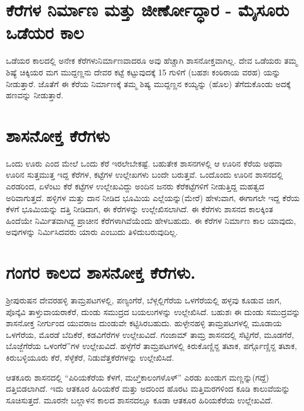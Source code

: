 \section*{ಕೆರೆಗಳ ನಿರ್ಮಾಣ ಮತ್ತು ಜೀರ್ಣೋದ್ಧಾರ - ಮೈಸೂರು ಒಡೆಯರ ಕಾಲ}

ಒಡೆಯರ ಕಾಲದಲ್ಲಿ ಅನೇಕ ಕೆರೆಗಳುನಿರ್ಮಾಣವಾದರೂ ಅವು ಹೆಚ್ಚಾಗಿ ಶಾಸನೋಕ್ತವಾಗಿಲ್ಲ. ದೇವ ಒಡೆಯರು ತಮ್ಮ ಶಿಷ್ಯೆ ಚಿಕ್ಕಿಯರ ಮಗ ಮುದ್ದಣ್ಣನು ದೇವರ ಕಟ್ಟೆ ಕಟ್ಟುವುದಕ್ಕೆ 15 ಗುಳಿಗೆ (ಬಹಶಃ ಕಂಠಿರಾಯ ವರಹ) ಯನ್ನು ನೀಡುತ್ತಾರೆ. ಜೊತೆಗೆ ಈ ಕೆರೆಯ ನಿರ್ಮಾಣಕ್ಕೆ ತಮ್ಮ ಶಿಷ್ಯ ಮುದ್ದಣ್ಣನ ಕಯ್ಯನ್ನು (ಹೊಲ) ತೆಗೆದುಕೊಂಡು ಅದಕ್ಕೆ ಹಣವನ್ನು ನೀಡುತ್ತಾರೆ.

\section*{ಶಾಸನೋಕ್ತ ಕೆರೆಗಳು}

ಒಂದು ಊರು ಎಂದ ಮೇಲೆ ಒಂದು ಕೆರೆ ಇರಲೇಬೇಕಷ್ಟೆ. ಬಹುತೇಕ ಶಾಸನಗಳಲ್ಲಿ ಆ ಊರಿನ ಕೆರೆಯ ಅಥವಾ ಊರಿನ ಸುತ್ತಮುತ್ತ ಇದ್ದ ಕೆರೆಗಳ, ಕಟ್ಟೆಗಳ ಉಲ್ಲೇಖಗಳು ಬಂದೇ ಬರುತ್ತವೆ. ಒಂದೊಂದು ಊರಿನ ಶಾಸನದಲ್ಲಿ ಎರಡರಿಂದ, ಏಳೆಂಟು ಕೆರೆ ಕಟ್ಟೆಗಳ ಉಲ್ಲೇಖವಿದ್ದು ಅಂದಿನ ಜನರು ಕೆರೆಕಟ್ಟೆಗಳಿಗೆ ನೀಡುತ್ತಿದ್ದ ಮಹತ್ವದ ಅರಿವಾಗುತ್ತದೆ. ಹಳ್ಳಿಗಳ ಮತ್ತು ದಾನ ನೀಡಿದ ಭೂಮಿಯ ಎಲ್ಲೆಯನ್ನು(ಮೇರೆ) ಹೇಳುವಾಗ, ಈಗಾಗಲೇ ಇದ್ದ ಕೆರೆಯ ಕೆಳಗೆ ಭೂಮಿಯನ್ನು ದತ್ತಿ ನೀಡಿದಾಗ, ಈ ಕೆರೆಗಳನ್ನು ಉಲ್ಲೇಖಿಸಲಾಗಿದೆ. ಈ ಕೆರೆಗಳು ಶಾಸನದ ಕಾಲಕ್ಕಿಂತ ಹಿಂದೆಯೇ ನಿರ್ಮಿತವಾಗಿದ್ದ ಪ್ರಾಚೀನ ಕೆರೆಗಳಾಗಿವೆಯೆಂದು ಹೇಳಬಹುದು. ಈ ಕೆರೆಗಳ ನಿರ್ಮಾಣ ಕಾಲ ಯಾವುದು, ಅವುಗಳನ್ನು ನಿರ್ಮಿಸಿದವರು ಯಾರು ಎಂಬುದು ತಿಳಿದುಬರುವುದಿಲ್ಲ.

\section*{ಗಂಗರ ಕಾಲದ ಶಾಸನೋಕ್ತ ಕೆರೆಗಳು.}

ಶ‍್ರೀಪುರುಷನ ದೇವರಹಳ್ಳಿ ತಾಮ್ರಪಟಗಳಲ್ಲಿ, ಪಣ್ಯಂಗೆರೆ, ಬೆಳ್ಗಲ್ಲಿಗೆರೆಯ ಒಳಗೆರೆಯಲ್ಲಿ ಹಳ್ಳವು ಕೂಡುವ ಜಾಗ, ಪೊನ್ಕೆವಿ ತಾಳ್ತುವಾಯರಾಕೆರೆ, ದುಂಡು ಸಮುದ್ರದ ಬಯಲುಗಳನ್ನು ಉಲ್ಲೇಖಿಸಿದೆ. ಬಹುಶಃ ಈ ದುಂಡು ಸಮುದ್ರವನ್ನು ಶಾಸನೋಕ್ತ ನೀರ್ಗುಂದ ಯುವರಾಜ ದುಂಡುವೇ ಕಟ್ಟಿಸಿರಬಹುದು. ಹುಳ್ಳೇನಹಳ್ಳಿ ತಾಮ್ರಪಟಗಳಲ್ಲಿ ಮೂಡಾಯ ಒಳಗೆರೆಯ, ಮೊರಡೆ ಬೆದಿಕೆರೆ, ಕಡವಿಗೆರೆಗಳ ಉಲ್ಲೇಖವಿದೆ. ಗಂಜಾಮ್ ತಾಮ್ರ ಶಾಸನದಲ್ಲಿ ಸೆಟ್ಟಿಗೆರೆ, ಮೂಡಗೆರೆ, ಬೊಜ್ಜೆಗೆರೆಯ ಒಳಂಗೆರೆ”ಗಳ ಉಲ್ಲೇಖವಿದೆ. ಹಳ್ಳೆಗೆರೆ ತಾಮ್ರಪಟಗಳಲ್ಲಿ ಕಿರುಕೊಣ್ಣಿನ್ದ ತಟಾಕ, ಪರ್ಗ್ಗೊಣ್ಣಿನ್ದ ತಟಾಕ, ಕಿರುಬಳ್ಳಿಯೂರು ಕೆರೆ, ಸೆಳ್ಳೆಕೆರೆ, ನಿಡುವೆತ್ತಕೆರೆಗಳನ್ನು ಉಲ್ಲೇಖಿಸಿದೆ.

ಆತಕೂರು ಶಾಸನದಲ್ಲಿ “ಪಿರಿಯಕೆರೆಯ ಕೆಳಗೆ, ಮೞ್ತಿಕಾಲಂಗಳೊಳ್​” ಎರಡು ಖಂಡುಗ ಮಣ್ಣನ್ನು(ಗದ್ದೆ) ದತ್ತಿಬಿಡಲಾಗಿದೆ. ಇದು ಆತಕೂರ ಹಿರಿಯಕೆರೆ ಮತ್ತು ಅದರಿಂದ ಹೊರಟ ಮತ್ತಿಮರಗಳಿಂದ ಕೂಡಿ ಕಾಲುವೆಯನ್ನು ಸೂಚಿಸುತ್ತದೆ. ಮೂರನೇ ಬಲ್ಲಾಳನ ಕಾಲದ ಶಾಸನದಲ್ಲೂ ಕೂಡಾ ಆತಕೂರ ಹಿರಿಯಕೆರೆಯ ಉಲ್ಲೇಖವಿದೆ.

